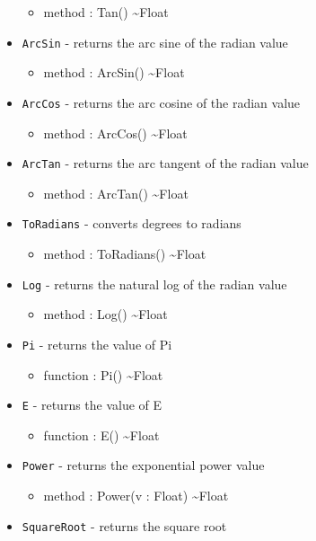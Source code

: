 \documentclass[11pt]{article}
\begin{document}
\begin{itemize}
\begin{itemize}
  \item method : Tan() \textasciitilde Float
  \end{itemize}
\item \texttt{ArcSin} - returns the arc sine of the radian value
  \begin{itemize}
  \item method : ArcSin() \textasciitilde Float
  \end{itemize}
\item \texttt{ArcCos} - returns the arc cosine of the radian value
  \begin{itemize}
  \item method : ArcCos() \textasciitilde Float
  \end{itemize}
\item \texttt{ArcTan} - returns the arc tangent of the radian value
  \begin{itemize}
  \item method : ArcTan() \textasciitilde Float
  \end{itemize}
\item \texttt{ToRadians} - converts degrees to radians
  \begin{itemize}
  \item method : ToRadians() \textasciitilde Float
  \end{itemize}
\item \texttt{Log} - returns the natural log of the radian value
  \begin{itemize}
  \item method : Log() \textasciitilde Float
  \end{itemize}
\item \texttt{Pi} - returns the value of Pi
  \begin{itemize}
  \item function : Pi() \textasciitilde Float
  \end{itemize}
\item \texttt{E} - returns the value of E
  \begin{itemize}
  \item function : E() \textasciitilde Float
  \end{itemize}
\item \texttt{Power} - returns the exponential power value
  \begin{itemize}
  \item method : Power(v : Float) \textasciitilde Float
  \end{itemize}
\item \texttt{SquareRoot} - returns the square root

\end{itemize}
\end{document}
